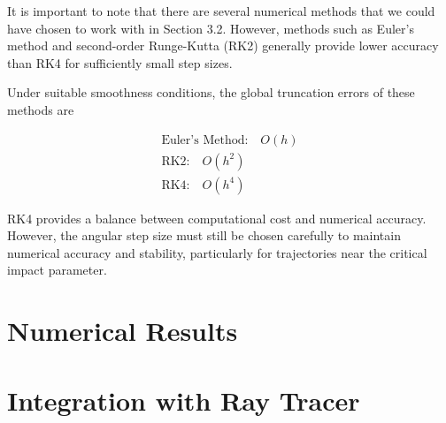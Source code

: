 \documentclass[12pt]{article}
\numberwithin{equation}{section}
\begin{document}
It is important to note that there are several numerical 
methods that we could have chosen to work with in 
Section 3.2. However, methods such as Euler's method 
and second-order Runge-Kutta (RK2) generally provide 
lower accuracy than RK4 for sufficiently small step 
sizes.

Under suitable smoothness conditions, the global 
truncation errors of these methods are

\begin{gather}
    \text{Euler's Method:} \quad O(h) \\
    \text{RK2:} \quad O(h^2) \\
    \text{RK4:} \quad O(h^4)
\end{gather}

RK4 provides a balance between computational cost and 
numerical accuracy. However, the angular step size must 
still be chosen carefully to maintain numerical accuracy 
and stability, particularly for trajectories near the 
critical impact parameter.

\newpage

\section{Numerical Results}

\newpage

\section{Integration with Ray Tracer}
\end{document}
